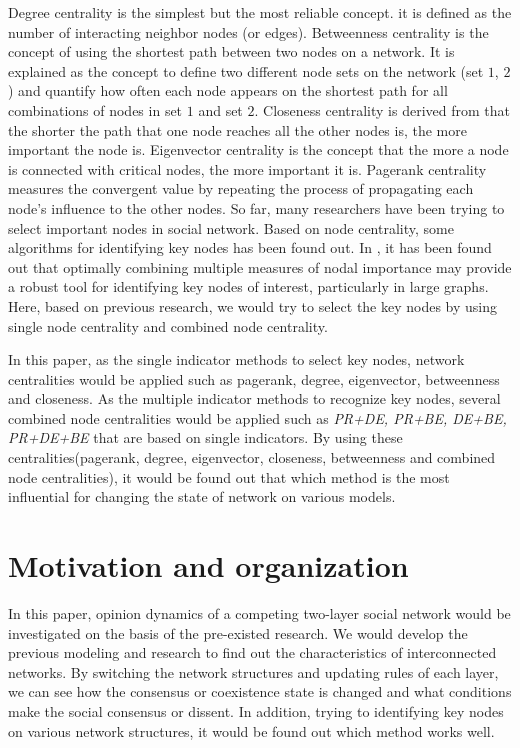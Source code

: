 Degree centrality is the simplest but the most reliable concept. it is defined as the number of interacting neighbor nodes (or edges). Betweenness centrality is the concept of using the shortest path between two nodes on a network. It is explained as the concept to define two different node sets on the network (set $1$, $2$) and quantify how often each node appears on the shortest path for all combinations of nodes in set $1$ and set $2$. Closeness centrality is derived from that the shorter the path that one node reaches all the other nodes is, the more important the node is. Eigenvector centrality is the concept that the more a node is connected with critical nodes, the more important it is. Pagerank centrality measures the convergent value by repeating the process of propagating each node's influence to the other nodes.
So far, many researchers have been trying to select important nodes in social network.\parencite{eom2015, white2003, mesgari2015, hwang1981, huang2014} Based on node centrality, some algorithms for identifying key nodes has been found out. In \parencite{mesgari2015, huang2014}, it has been found out that optimally combining multiple measures of nodal importance may provide a robust tool for identifying key nodes of interest, particularly in large graphs. Here, based on previous research, we would try to select the key nodes by using single node centrality and combined node centrality.

In this paper, as the single indicator methods to select key nodes, network centralities would be applied such as pagerank, degree, eigenvector, betweenness and closeness. As the multiple indicator methods to recognize key nodes, several combined node centralities would be applied such as \textit{PR+DE, PR+BE, DE+BE, PR+DE+BE} that are based on single indicators.  By using these centralities(pagerank, degree, eigenvector, closeness, betweenness and combined node centralities), it would be found out that which method is the most influential for changing the state of network on various models.\\  

\section{Motivation and organization}
In this paper, opinion dynamics of a competing two-layer social network would be investigated on the basis of the pre-existed research\parencite{alvarez2016, gomez2015, diep2017, rocca2014}. We would develop the previous modeling and research to find out the characteristics of interconnected networks. By switching the network structures and updating rules of each layer, we can see how the consensus or coexistence state is changed and what conditions make the social consensus or dissent. In addition, trying to identifying key nodes on various network structures, it would be found out which method works well.

